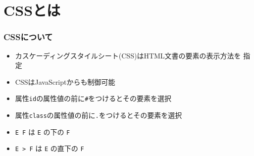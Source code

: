 

\frame{\maketitle}
\section{CSSとは}
\begin{frame}[containsverbatim]
 \frametitle{CSSについて}
 \begin{itemize}
  \item カスケーディングスタイルシート(CSS)はHTML文書の要素の表示方法を
        指定
  \item CSSはJavaScriptからも制御可能
 \end{itemize}
\begin{itemize}
 \item 属性\texttt{id}の属性値の前に\texttt{\#}をつけるとその要素を選択
 \item 属性\texttt{class}の属性値の前に\texttt{.}をつけるとその要素を選択
 \item \Verb+E F+ は \Verb+E+ の下の \Verb+F+
 \item \Verb+E > F+ は \Verb+E+ の直下の \Verb+F+
\end{itemize}
 \end{frame}
